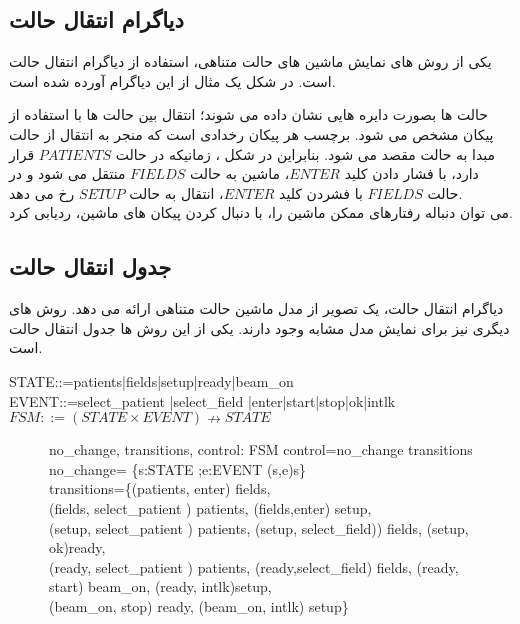 \subsection{دیاگرام انتقال حالت}
یکی از روش های نمایش ماشین های حالت متناهی، استفاده از دیاگرام انتقال حالت
 است. در شکل  یک مثال از این دیاگرام آورده شده است.
\begin{figure}

\end{figure}
حالت ها بصورت دایره هایی نشان داده می شوند؛ انتقال بین حالت ها با استفاده از پیکان مشخص می شود. برچسب هر پیکان رخدادی است که منجر به انتقال از حالت مبدا به حالت مقصد می شود. بنابراین در شکل    ، زمانیکه در حالت $PATIENTS$ قرار دارد، با فشار دادن کلید $ENTER$، ماشین به حالت $FIELDS$ منتقل می شود و در حالت $FIELDS$ با فشردن کلید $ENTER$، انتقال به حالت $SETUP$ رخ می دهد. 
\\
می توان دنباله رفتارهای ممکن ماشین را، با دنبال کردن پیکان های ماشین، ردیابی کرد.
\subsection{جدول انتقال حالت}
دیاگرام انتقال حالت، یک تصویر از مدل ماشین حالت متناهی ارائه می دهد. روش های دیگری نیز برای نمایش مدل مشابه وجود دارند. یکی از این روش ها جدول انتقال حالت
 است.



\begin{LTR}
STATE::=patients|fields|setup|ready|beam\_on\\
EVENT::=select\_patient |select\_field |enter|start|stop|ok|intlk\\
$FSM::=(STATE \times EVENT)\nrightarrow STATE$
\end{LTR}

\begin{figure}
\centering
\begin{axdef}
no\_change, transitions, control: FSM
\ST
control=no\_change \oplus transitions\\
no\_change= \{s:STATE ;e:EVENT \bullet(s,e)\mapsto s\}\\
transitions=\{(patients, enter) \mapsto fields,\\
\enspace (fields, select\_patient ) \mapsto patients, (fields,enter) \mapsto setup,\\
\enspace (setup, select\_patient ) \mapsto patients, (setup, select\_field)) \mapsto fields, (setup, ok)\mapsto ready,\\
\enspace (ready, select\_patient ) \mapsto patients, (ready,select\_field) \mapsto fields, (ready, start) \mapsto beam\_on, (ready, intlk)\mapsto setup,\\
\enspace (beam\_on, stop) \mapsto ready, (beam\_on, intlk) \mapsto setup\}
\end{axdef}
\caption{}
\label{fig3}
\end{figure}
